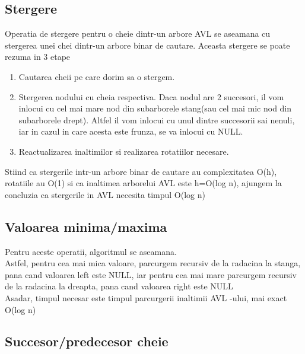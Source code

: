 \documentclass[12pt]{article}
\begin{document}
\subsection{Stergere}
Operatia de stergere pentru o cheie dintr-un arbore AVL se aseamana cu stergerea unei chei dintr-un arbore binar de cautare. Aceasta stergere se poate rezuma in 3 etape
\begin{enumerate}

\item Cautarea cheii pe care dorim sa o stergem.
\item Stergerea nodului cu cheia respectiva. Daca nodul are 2 succesori, il vom inlocui cu cel mai mare nod din subarborele stang(sau cel mai mic nod din subarborele drept). Altfel il vom inlocui cu unul dintre succesorii sai nenuli, iar in cazul in care acesta este frunza, se va inlocui cu NULL.
\item Reactualizarea inaltimilor si realizarea rotatiilor necesare.

\end{enumerate}


Stiind ca stergerile intr-un arbore binar de cautare au complexitatea O(h), rotatiile au O(1) si ca inaltimea arborelui AVL este h=O(log n), ajungem la concluzia ca stergerile in AVL necesita timpul O(log n)

\newpage
\subsection{Valoarea minima\slash maxima }

Pentru aceste operatii, algoritmul se aseamana.\\
Astfel, pentru cea mai mica valoare, parcurgem recursiv de la radacina la stanga, pana cand valoarea left este NULL, iar pentru cea mai mare parcurgem recursiv de la radacina la dreapta, pana cand valoarea right este NULL\\
Asadar, timpul necesar este timpul parcurgerii inaltimii AVL -ului, mai exact O(log n)


\subsection{Succesor\slash predecesor cheie}
\end{document}
